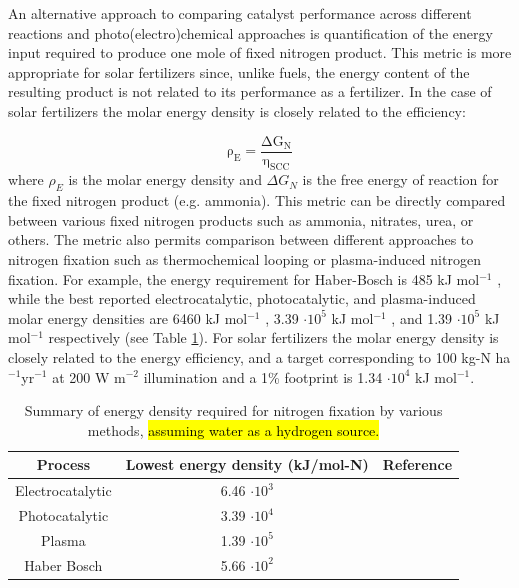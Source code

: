 
An alternative approach to comparing catalyst performance across different reactions and photo(electro)chemical approaches is quantification of the energy input required to produce one mole of fixed nitrogen product. This metric is more appropriate for solar fertilizers since, unlike fuels, the energy content of the resulting product is not related to its performance as a fertilizer. In the case of solar fertilizers the molar energy density is closely related to the efficiency:

\begin{equation}
\mathrm{
\rho_{E} = \frac{\Delta G_{N}}{\eta_{SCC}}
}
\label{eq:eng_dens}
\end{equation}
where $\rho_{E}$ is the molar energy density and $\Delta G_{N}$ is the free energy of reaction for the fixed nitrogen product (e.g. ammonia). This metric can be directly compared between various fixed nitrogen products such as ammonia, nitrates, urea, or others. The metric also permits comparison between different approaches to nitrogen fixation such as thermochemical looping or plasma-induced nitrogen fixation. For example, the energy requirement for Haber-Bosch is 485 kJ mol$^{-1}$ \cite{Schloegl_2003}, while the best reported electrocatalytic, photocatalytic, and plasma-induced molar energy densities are  6460 kJ mol$^{-1}$ \cite{Song_2018}, 3.39 $\cdot 10^5$ kJ mol$^{-1}$  \cite{Shiraishi_2018}, and 1.39 $\cdot 10^5$ kJ mol$^{-1}$ \cite{Hawtof_2019} respectively (see Table \ref{tab:energy_density}). For solar fertilizers the molar energy density is closely related to the energy efficiency, and a target corresponding to 100 kg-N ha$^{-1}$yr$^{-1}$ at 200 W m$^{-2}$ illumination and a 1\% footprint is 1.34 $\cdot 10^4$ kJ mol$^{-1}$. 

\begin{table}
\centering
\begin{tabular}{ |c c c| }
\hline
 Process & Lowest energy density (kJ/mol-N) & Reference \\  \hline
 Electrocatalytic & 6.46 $\cdot 10^3$ & \cite{Song_2018} \\ \hline
 Photocatalytic & 3.39 $\cdot 10^4$ & \cite{Shiraishi_2018} \\ \hline
 Plasma & 1.39  $\cdot 10^5$  & \cite{Hawtof_2019} \\ \hline
 Haber Bosch & 5.66 $\cdot 10^2$ & \cite{Grundt_1982} \\ \hline
\end{tabular}
\caption{Summary of energy density required for nitrogen fixation by various methods, \hl{assuming water as a hydrogen source.} }
\label{tab:energy_density}
\end{table}


